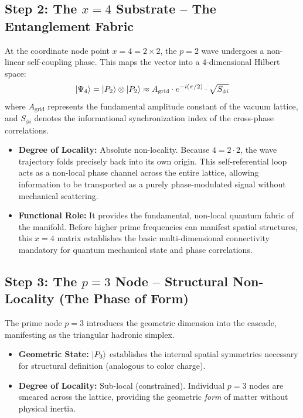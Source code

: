 \documentclass[11pt,a4paper]{article}
\theoremstyle{plain}
\theoremstyle{definition}
\theoremstyle{remark}
\begin{document}
\subsection{Step 2: The $x=4$ Substrate – The Entanglement Fabric}
At the coordinate node point $x = 4 = 2 \times 2$, the $p=2$ wave undergoes a non-linear self-coupling phase. This maps the vector into a 4-dimensional Hilbert space:
\begin{equation}
\ket{\Psi_4} = \ket{P_2} \otimes \ket{P_2} \approx A_{\text{grid}} \cdot e^{-i(\pi/2)} \cdot \sqrt{S_{\phi i}}
\end{equation}
where $A_{\text{grid}}$ represents the fundamental amplitude constant of the vacuum lattice, and $S_{\phi i}$ denotes the informational synchronization index of the cross-phase correlations.
\begin{itemize}
    \item \textbf{Degree of Locality:} Absolute non-locality. Because $4 = 2 \cdot 2$, the wave trajectory folds precisely back into its own origin. This self-referential loop acts as a non-local phase channel across the entire lattice, allowing information to be transported as a purely phase-modulated signal without mechanical scattering.
    \item \textbf{Functional Role:} It provides the fundamental, non-local quantum fabric of the manifold. Before higher prime frequencies can manifest spatial structures, this $x=4$ matrix establishes the basic multi-dimensional connectivity mandatory for quantum mechanical state and phase correlations.
\end{itemize}

\subsection{Step 3: The $p=3$ Node – Structural Non-Locality (The Phase of Form)}
The prime node $p=3$ introduces the geometric dimension into the cascade, manifesting as the triangular hadronic simplex.
\begin{itemize}
    \item \textbf{Geometric State:} $\ket{P_3}$ establishes the internal spatial symmetries necessary for structural definition (analogous to color charge).
    \item \textbf{Degree of Locality:} Sub-local (constrained). Individual $p=3$ nodes are smeared across the lattice, providing the geometric \textit{form} of matter without physical inertia.
\end{itemize}
\end{document}
